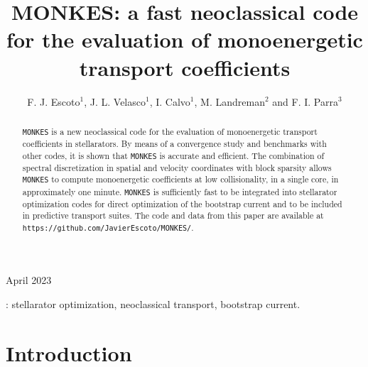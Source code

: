 \documentclass[10pt]{iopart}
\newcommand{\MONKES}{{\texttt{MONKES}}}
\begin{document}
\title[MONKES: a fast neoclassical code for the evaluation of monoenergetic transport coefficients]{MONKES: a fast neoclassical code for the evaluation of monoenergetic transport coefficients}

\author{F. J. Escoto$^1$, J. L. Velasco$^1$, I. Calvo$^1$, M. Landreman$^2$ and F. I. Parra$^3$}
\address{$^1$Laboratorio Nacional de Fusión, CIEMAT, 28040 Madrid, Spain}
\address{$^2$University of Maryland, College Park, MD 20742, USA}
\address{$^3$Princeton Plasma Physics Laboratory, Princeton, NJ 08540, USA}
\vspace{10pt}
\begin{indented}
\item[]April 2023
\end{indented}

\begin{abstract}
	{\MONKES} is a new neoclassical code for the evaluation of monoenergetic transport coefficients in stellarators. By means of a convergence study and benchmarks with other codes, it is shown that {\MONKES} is accurate and efficient. The combination of spectral discretization in spatial and velocity coordinates with block sparsity allows {\MONKES} to compute monoenergetic coefficients at low collisionality, in a single core, in approximately one minute. {\MONKES} is sufficiently fast to be integrated into stellarator optimization codes for direct optimization of the bootstrap current and to be included in predictive transport suites. The code and data from this paper are available at \texttt{https://github.com/JavierEscoto/MONKES/}.   
\end{abstract}

%
\vspace{2pc}
: stellarator optimization, neoclassical transport,  bootstrap current.
%
\submitto{\NF}
%
% 
\ioptwocol
%

\section{Introduction}
\label{sec:Introduction}

\end{document}
